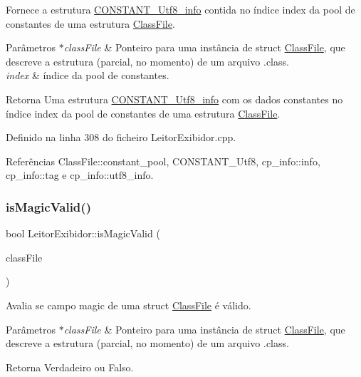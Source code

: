 Fornece a estrutura \hyperlink{structCONSTANT__Utf8__info}{C\+O\+N\+S\+T\+A\+N\+T\+\_\+\+Utf8\+\_\+info} contida no índice index da pool de constantes de uma estrutura \hyperlink{classClassFile}{Class\+File}. 
\begin{DoxyParams}{Parâmetros}
{\em $\ast$class\+File} & Ponteiro para uma instância de struct \hyperlink{classClassFile}{Class\+File}, que descreve a estrutura (parcial, no momento) de um arquivo .class. \\
\hline
{\em index} & índice da pool de constantes. \\
\hline
\end{DoxyParams}
\begin{DoxyReturn}{Retorna}
Uma estrutura \hyperlink{structCONSTANT__Utf8__info}{C\+O\+N\+S\+T\+A\+N\+T\+\_\+\+Utf8\+\_\+info} com os dados constantes no índice index da pool de constantes de uma estrutura \hyperlink{classClassFile}{Class\+File}. 
\end{DoxyReturn}


Definido na linha 308 do ficheiro Leitor\+Exibidor.\+cpp.



Referências Class\+File\+::constant\+\_\+pool, C\+O\+N\+S\+T\+A\+N\+T\+\_\+\+Utf8, cp\+\_\+info\+::info, cp\+\_\+info\+::tag e cp\+\_\+info\+::utf8\+\_\+info.

\mbox{\label{classLeitorExibidor_ad6afc52067f5e3542024c7b494ce3ae3}} 
\subsubsection{\texorpdfstring{is\+Magic\+Valid()}{isMagicValid()}}
{\footnotesize\ttfamily bool Leitor\+Exibidor\+::is\+Magic\+Valid (\begin{DoxyParamCaption}\item[{\hyperlink{classClassFile}{Class\+File} $\ast$}]{class\+File }\end{DoxyParamCaption})\hspace{0.3cm}{\ttfamily [private]}}

Avalia se campo magic de uma struct \hyperlink{classClassFile}{Class\+File} é válido. 
\begin{DoxyParams}{Parâmetros}
{\em $\ast$class\+File} & Ponteiro para uma instância de struct \hyperlink{classClassFile}{Class\+File}, que descreve a estrutura (parcial, no momento) de um arquivo .class. \\
\hline
\end{DoxyParams}
\begin{DoxyReturn}{Retorna}
Verdadeiro ou Falso. 
\end{DoxyReturn}


